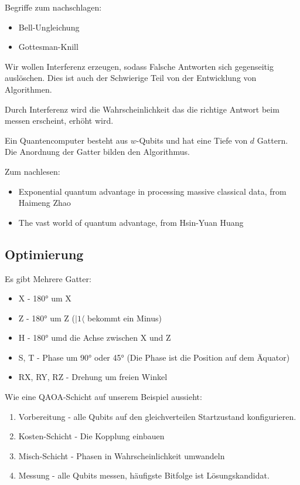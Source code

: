 \documentclass[a4paper]{article}
\begin{document}
Begriffe zum nachschlagen:

\begin{itemize}
    \item Bell-Ungleichung
    \item Gottesman-Knill 
\end{itemize}

Wir wollen Interferenz erzeugen, sodass Falsche Antworten sich gegenseitig auslöschen. Dies ist auch der Schwierige Teil von der Entwicklung von Algorithmen.

Durch Interferenz wird die Wahrscheinlichkeit das die richtige Antwort beim messen erscheint, erhöht wird.

Ein Quantencomputer besteht aus $w$-Qubits und hat eine Tiefe von $d$ Gattern. Die Anordnung der Gatter bilden den Algorithmus.

Zum nachlesen: 

\begin{itemize}
    \item Exponential quantum advantage in processing massive classical data, from Haimeng Zhao
    \item The vast world of quantum advantage, from Hsin-Yuan Huang
\end{itemize}

\subsection{Optimierung}

Es gibt Mehrere Gatter:

\begin{itemize}
    \item X - 180° um X
    \item Z - 180° um Z ($|1\langle$ bekommt ein Minus)
    \item H - 180° umd die Achse zwischen X und Z
    \item S, T - Phase um 90° oder 45° (Die Phase ist die Position auf dem Äquator)
    \item RX, RY, RZ - Drehung um freien Winkel
\end{itemize}

Wie eine QAOA-Schicht auf unserem Beispiel aussieht:

\begin{enumerate}
    \item Vorbereitung - alle Qubits auf den gleichverteilen Startzustand konfigurieren.
    \item Kosten-Schicht - Die Kopplung einbauen
    \item Misch-Schicht - Phasen in Wahrscheinlichkeit umwandeln
    \item Messung - alle Qubits messen, häufigste Bitfolge ist Lösungskandidat.
\end{enumerate}
\end{document}

